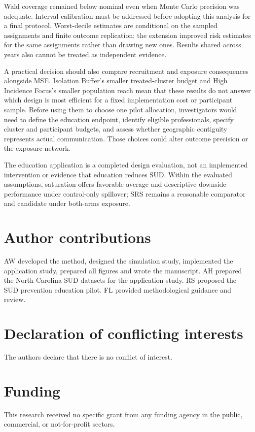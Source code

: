 \documentclass[Afour,sagev,times]{sagej}
\begin{document}
Wald coverage remained below nominal even when Monte Carlo precision was adequate. Interval calibration must be addressed before adopting this analysis for a final protocol. Worst-decile estimates are conditional on the sampled assignments and finite outcome replication; the extension improved risk estimates for the same assignments rather than drawing new ones. Results shared across years also cannot be treated as independent evidence.

A practical decision should also compare recruitment and exposure consequences alongside MSE. Isolation Buffer's smaller treated-cluster budget and High Incidence Focus's smaller population reach mean that these results do not answer which design is most efficient for a fixed implementation cost or participant sample. Before using them to choose one pilot allocation, investigators would need to define the education endpoint, identify eligible professionals, specify cluster and participant budgets, and assess whether geographic contiguity represents actual communication. Those choices could alter outcome precision or the exposure network.

The education application is a completed design evaluation, not an implemented intervention or evidence that education reduces SUD. Within the evaluated assumptions, saturation offers favorable average and descriptive downside performance under control-only spillover; SRS remains a reasonable comparator and candidate under both-arms exposure.

\ifctjreading
\raggedright
\fi
\section*{Author contributions}
AW developed the method, designed the simulation study, implemented the application study, prepared all figures and wrote the manuscript. AH prepared the North Carolina SUD datasets for the application study. RS proposed the SUD prevention education pilot. FL provided methodological guidance and review.
\section*{Declaration of conflicting interests}
The authors declare that there is no conflict of interest.
\section*{Funding}
This research received no specific grant from any funding agency in the public, commercial, or not-for-profit sectors.
\end{document}

